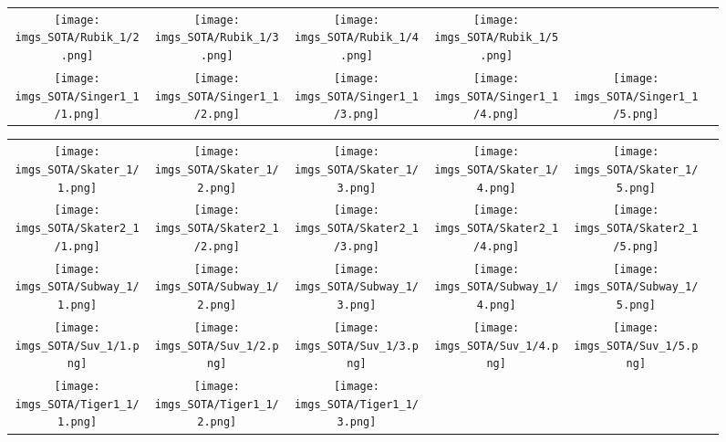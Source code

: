 \begin{figure}[H]
\begin{tabular}{@{}c@{}c@{}c@{}c@{}c@{}c@{}}
\texttt{[image: imgs\_SOTA/Rubik\_1/2.png]}&
\texttt{[image: imgs\_SOTA/Rubik\_1/3.png]}&
\texttt{[image: imgs\_SOTA/Rubik\_1/4.png]}&
\texttt{[image: imgs\_SOTA/Rubik\_1/5.png]}&
\\
\texttt{[image: imgs\_SOTA/Singer1\_1/1.png]}&
\texttt{[image: imgs\_SOTA/Singer1\_1/2.png]}&
\texttt{[image: imgs\_SOTA/Singer1\_1/3.png]}&
\texttt{[image: imgs\_SOTA/Singer1\_1/4.png]}&
\texttt{[image: imgs\_SOTA/Singer1\_1/5.png]}&
\\
\end{tabular}\end{figure}\begin{figure}[H]
\setlength{\tabcolsep}{6pt}
\renewcommand{\arraystretch}{0}
\begin{tabular}{@{}c@{}c@{}c@{}c@{}c@{}c@{}}\texttt{[image: imgs\_SOTA/Skater\_1/1.png]}&
\texttt{[image: imgs\_SOTA/Skater\_1/2.png]}&
\texttt{[image: imgs\_SOTA/Skater\_1/3.png]}&
\texttt{[image: imgs\_SOTA/Skater\_1/4.png]}&
\texttt{[image: imgs\_SOTA/Skater\_1/5.png]}&
\\
\texttt{[image: imgs\_SOTA/Skater2\_1/1.png]}&
\texttt{[image: imgs\_SOTA/Skater2\_1/2.png]}&
\texttt{[image: imgs\_SOTA/Skater2\_1/3.png]}&
\texttt{[image: imgs\_SOTA/Skater2\_1/4.png]}&
\texttt{[image: imgs\_SOTA/Skater2\_1/5.png]}&
\\
\texttt{[image: imgs\_SOTA/Subway\_1/1.png]}&
\texttt{[image: imgs\_SOTA/Subway\_1/2.png]}&
\texttt{[image: imgs\_SOTA/Subway\_1/3.png]}&
\texttt{[image: imgs\_SOTA/Subway\_1/4.png]}&
\texttt{[image: imgs\_SOTA/Subway\_1/5.png]}&
\\
\texttt{[image: imgs\_SOTA/Suv\_1/1.png]}&
\texttt{[image: imgs\_SOTA/Suv\_1/2.png]}&
\texttt{[image: imgs\_SOTA/Suv\_1/3.png]}&
\texttt{[image: imgs\_SOTA/Suv\_1/4.png]}&
\texttt{[image: imgs\_SOTA/Suv\_1/5.png]}&
\\
\texttt{[image: imgs\_SOTA/Tiger1\_1/1.png]}&
\texttt{[image: imgs\_SOTA/Tiger1\_1/2.png]}&
\texttt{[image: imgs\_SOTA/Tiger1\_1/3.png]}&

\end{tabular}
\end{figure}
